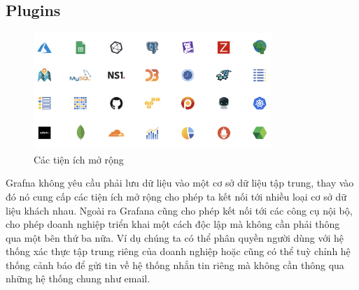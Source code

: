 \subsection{Plugins}
\begin{figure}[H] %
    \centering %
    \includegraphics[width=0.8\textwidth]{figures/grafana_plugins.png} 
    \caption{Các tiện ích mở rộng} %
    \label{fig:fig_01}
\end{figure}
Grafna không yêu cầu phải lưu dữ liệu vào một cơ sở dữ liệu tập trung, thay vào đó nó cung cấp các tiện ích mở rộng cho phép ta kết nối tới nhiều loại cơ sở dữ liệu khách nhau. Ngoài ra Grafana cũng cho phép kết nối tới các công cụ nội bộ, cho phép doanh nghiệp triển khai một cách độc lập mà không cần phải thông qua một bên thứ ba nữa. Ví dụ chúng ta có thể phân quyền người dùng với hệ thống xác thực tập trung riêng của doanh nghiệp hoặc cũng có thể tuỳ chỉnh hệ thống cảnh báo để gửi tin về hệ thống nhắn tin riêng mà không cần thông qua những hệ thống chung như email.
